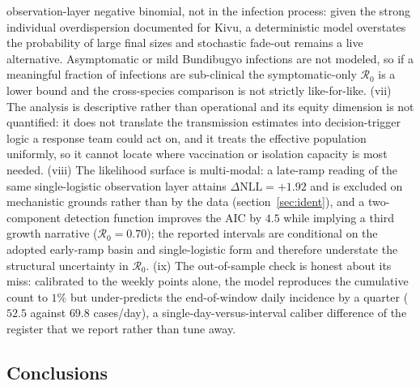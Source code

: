 \documentclass[10pt]{plos}
\newcommand{\Reff}{\mathcal{R}}
\begin{document}
observation-layer negative binomial, not in the infection process: given
the strong individual overdispersion documented for Kivu, a
deterministic model overstates the probability of large final sizes and
stochastic fade-out remains a live alternative. Asymptomatic or mild
Bundibugyo infections are not modeled, so if a meaningful fraction of
infections are sub-clinical the symptomatic-only $\Reff_0$ is a lower
bound and the cross-species comparison is not strictly like-for-like.
(vii) The analysis is descriptive rather than operational and its equity
dimension is not quantified: it does not translate the transmission
estimates into decision-trigger logic a response team could act on, and
it treats the effective population uniformly, so it cannot locate where
vaccination or isolation capacity is most needed. (viii) The likelihood
surface is multi-modal: a late-ramp reading of the same single-logistic
observation layer attains $\Delta\mathrm{NLL}=+1.92$ and is excluded on
mechanistic grounds rather than by the data (section~\ref{sec:ident}),
and a two-component detection function improves the AIC by $4.5$ while
implying a third growth narrative ($\Reff_0=0.70$); the reported
intervals are conditional on the adopted early-ramp basin and
single-logistic form and therefore understate the structural uncertainty
in $\Reff_0$. (ix) The out-of-sample check is honest about its miss:
calibrated to the weekly points alone, the model reproduces the
cumulative count to $1\%$ but under-predicts the end-of-window daily
incidence by a quarter ($52.5$ against $69.8$ cases/day), a
single-day-versus-interval caliber difference of the register that we
report rather than tune away.
\subsection{Conclusions}
\end{document}
